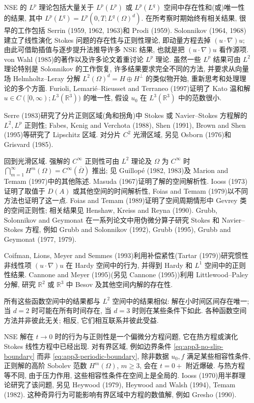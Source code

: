 \hypertarget{appendix-03-page-361}{}
NSE 的 $L^p$ 理论包括大量关于 $L^p(L^p)$ 或 $L^p(L^q)$ 空间中存在性和(或)唯一性的结果, 其中 $L^p(L^q)=L^p(0,T;L^q(\Omega)^d)$. 在所考察时期始终有相关结果, 很早的工作包括 Serrin (1959, 1962, 1963)和 Prodi (1959). Solonnikov (1964, 1968)建立了线性演化 Stokes 问题的存在性与正则性理论, 即动量方程去掉 $(u\cdot\nabla)u$; 由此可借助插值与逐步提升法推导许多 NSE 结果, 也就是把 $(u\cdot\nabla)u$ 看作源项. von Wahl (1985)的著作以及许多论文着重讨论 $L^p$ 理论. 虽然一些 $L^p$ 结果可由 $L^2$ 理论特别是 Solonnikov 的工作恢复, 许多结果要求完全不同的方法, 并要求从向量场 Helmholtz--Leray 分解 $L^2(\Omega)^d=H\oplus H^\perp$ 的类似物开始, 重新思考和处理理论的多个方面. Furioli, Lemarié--Rieusset and Terraneo (1997)证明了 Kato 温和解 $u\in C([0,\infty);L^3(\mathbb R^3))$ 的唯一性, 假设 $u_0$ 在 $L^3(\mathbb R^3)$ 中的范数很小.

Serre (1983)研究了分片正则区域(角和拐角)中 Stokes 或 Navier--Stokes 方程解的 $L^2,L^p$ 正则性; Fabes, Kenig and Verchota (1988), Shen (1991), Brown and Shen (1995)等研究了 Lipschitz 区域. 对分片 $C^2$ 光滑区域, 另见 Osborn (1976)和 Grisvard (1985).

回到光滑区域. 强解的 $C^\infty$ 正则性可由 $L^2$ 理论及 $\Omega$ 为 $C^\infty$ 时 $\bigcap_{m=1}^\infty H^m(\Omega)=C^\infty(\overline\Omega)$ 推出; 见 Guillopé (1982, 1983)及 Marion and Temam (1997)中的其他陈述. Masuda (1967)证明了解的空间解析性. Iooss (1973)证明了取值于 $D(A)$ 或其他空间的时间解析性, Foias and Temam (1979)以不同方法也证明了这一点. Foias and Temam (1989)证明了空间周期情形中 Gevrey 类的空间正则性; 相关结果见 Henshaw, Kreiss and Reyna (1990). Grubb, Solonnikov and Geymonat 在一系列论文中用伪微分算子研究 Stokes 和 Navier--Stokes 方程, 例如 Grubb and Solonnikov (1992), Grubb (1995), Grubb and Geymonat (1977, 1979).

Coifman, Lions, Meyer and Semmes (1993)利用补偿紧性(Tartar (1979))研究惯性非线性项 $(u\cdot\nabla)u$ 在 Hardy 空间中的行为, 并得到 Hardy 和 $L^1$ 空间中的正则性结果. Cannone and Meyer (1995)(另见 Cannone (1995))利用 Littlewood--Paley 分解, 研究 $\mathbb R^2$ 或 $\mathbb R^3$ 中 Besov 及其他空间内解的存在性.

所有这些函数空间中的结果都与 $L^2$ 空间中的结果相似: 解在小时间区间存在唯一; 当 $d=2$ 时可能在所有时间存在, 当 $d=3$ 时则在某些条件下如此. 各种函数空间方法并非彼此无关; 相反, 它们相互联系并彼此受益.

NSE 解在 $t\to0$ 时的行为与正则性是一个偏微分方程问题, 它在热方程或演化 Stokes 线性方程中已经出现. 对有界区域, 例如边界条件 
\eqref{eq:app3-no-slip-boundary} 而非 
\eqref{eq:app3-periodic-boundary}, 除非数据 $u_0,f$ 满足某些相容性条件, 正则解的高阶 Sobolev 范数 $H^m(\Omega)$, $m\geq3$, 会在 $t=0+$ 附近爆破. 与热方程等不同, 由于压力作用, 这些相容性条件在空间上是全局的. Iooss (1970)用半群理论研究了该问题, 另见 Heywood (1979), Heywood and Walsh (1994), Temam (1982). 这种奇异行为可能影响有界区域中方程的数值解, 例如 Gresho (1990).


